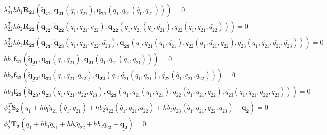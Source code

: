 \documentclass[10pt,letter]{book}
\begin{document}
     \begin{equation}\nonumber
       \begin{split}
         &\lambda_{21}^T h b_1 \mathbf{R_{21}}\left(\underline{\mathbf{\ddot{q}_{21}}},\mathbf{\dot{q}_{21}}(\dot{q_1},\ddot{q_{21}}),\mathbf{{q}_{21}}({q_1},\dot{q_{21}}(\dot{q_1},\ddot{q_{21}}))\right) = 0 \\
         &\lambda_{22}^T h b_2 \mathbf{R_{22}}\left(\underline{\mathbf{\ddot{q}_{22}}},\mathbf{\dot{q}_{22}}(\dot{q_1},\ddot{q_{21}},\ddot{q_{22}}),\mathbf{{q}_{22}}({q_1},\dot{q_{21}}(\dot{q_1},\ddot{q_{21}}),\dot{q_{22}}(\dot{q_1},\ddot{q_{21}},\ddot{q_{22}}))\right) = 0 \\
         &\lambda_{22}^T h b_3 \mathbf{R_{23}}\left(\underline{\mathbf{\ddot{q}_{23}}},
         \mathbf{\dot{q}_{23}}(\dot{q_1},\ddot{q_{21}},\ddot{q_{22}},\ddot{q_{23}}),
         \mathbf{{q}_{23}}({q_1},\dot{q_{21}}(\dot{q_1},\ddot{q_{21}}),\dot{q_{22}}(\dot{q_1},\ddot{q_{21}},\ddot{q_{22}}),\dot{q_{23}}(\dot{q_1},\ddot{q_{21}},\ddot{q_{22}},\ddot{q_{23}}))\right) = 0 \\
         &h b_1 \mathbf{f_{21}}\left(\underline{\mathbf{\ddot{q}_{21}}},\mathbf{\dot{q}_{21}}(\dot{q_1},\ddot{q_{21}}),\mathbf{{q}_{21}}({q_1},\dot{q_{21}}(q_1,\ddot{q_{21}}))\right) = 0 \\
         &h b_2 \mathbf{f_{22}}\left(\underline{\mathbf{\ddot{q}_{22}}},\mathbf{\dot{q}_{22}}(\dot{q_1},\ddot{q_{21}},\ddot{q_{22}}),\mathbf{{q}_{22}}({q_1},\dot{q_{21}}(\dot{q_1},\ddot{q_{21}}),\dot{q_{22}}(\dot{q_1},\ddot{q_{21}},\ddot{q_{22}}))\right) = 0 \\
         &h b_3 \mathbf{f_{23}}\left(\underline{\mathbf{\ddot{q}_{23}}},\mathbf{\dot{q}_{23}}(\dot{q_1},\ddot{q_{21}},\ddot{q_{22}},\ddot{q_{23}}),\mathbf{{q}_{23}}({q_1},\dot{q_{21}}(\dot{q_1},\ddot{q_{21}}),\dot{q_{22}}(\dot{q_1},\ddot{q_{21}},\ddot{q_{22}}),\dot{q_{23}}(\dot{q_1},\ddot{q_{21}},\ddot{q_{22}},\ddot{q_{23}}))\right) = 0 \\
         &\psi_2^T \mathbf{S_2}\left(q_1 + h b_1 \dot{q}_{21}(\dot{q_1},\ddot{q_{21}}) +  h b_2 \dot{q}_{22} (\dot{q_1},\ddot{q_{21}},\ddot{q_{22}}) +  h b_3 \dot{q}_{23} (\dot{q_1},\ddot{q_{21}},\ddot{q_{22}},\ddot{q_{23}}) - \underline{\mathbf{q_2}} \right) = 0\\
         &\phi_2^T \mathbf{T_2}\left(\dot{q}_1 + h b_1 \ddot{q}_{21} +  h b_2 \ddot{q}_{22} +  h b_2 \ddot{q}_{23} - \underline{\mathbf{\dot{q}_2}} \right) = 0 \\
       \end{split}
     \end{equation}
\end{document}
